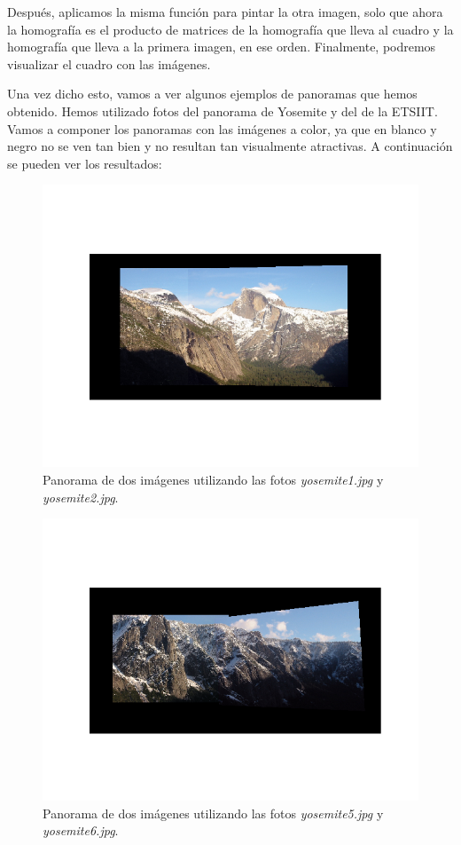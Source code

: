 \documentclass[11pt,a4paper]{article}
\begin{document}
Después, aplicamos la misma función para pintar la otra imagen, solo que ahora
la homografía es el producto de matrices de la homografía que lleva al cuadro
y la homografía que lleva a la primera imagen, en ese orden. Finalmente,
podremos visualizar el cuadro con las imágenes.

Una vez dicho esto, vamos a ver algunos ejemplos de panoramas que hemos obtenido.
Hemos utilizado fotos del panorama de Yosemite y del de la ETSIIT. Vamos a componer
los panoramas con las imágenes a color, ya que en blanco y negro no se ven tan bien
y no resultan tan visualmente atractivas. A continuación se pueden ver los resultados:

\begin{figure}[H]
	\centering
	\includegraphics[scale=0.7]{img/pano2-1}
	\caption{Panorama de dos imágenes utilizando las fotos \textit{yosemite1.jpg} y \textit{yosemite2.jpg}.}
	\label{fig:pano-yos12}
\end{figure}

\begin{figure}[H]
	\centering
	\includegraphics[scale=0.7]{img/pano2-2}
	\caption{Panorama de dos imágenes utilizando las fotos \textit{yosemite5.jpg} y \textit{yosemite6.jpg}.}
	\label{fig:pano-yos56}
\end{figure}
\end{document}
